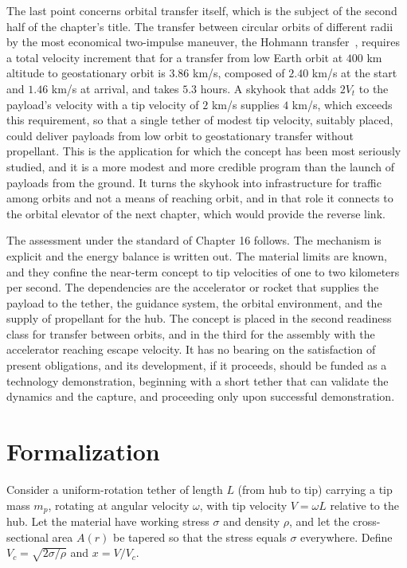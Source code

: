 The last point concerns orbital transfer itself, which is the subject of the second half of the chapter's title. The transfer between circular orbits of different radii by the most economical two-impulse maneuver, the Hohmann transfer~\cite{hohmann1925}, requires a total velocity increment that for a transfer from low Earth orbit at $400$ km altitude to geostationary orbit is $3.86$ km/s, composed of $2.40$ km/s at the start and $1.46$ km/s at arrival, and takes $5.3$ hours. A skyhook that adds $2V_t$ to the payload's velocity with a tip velocity of $2$ km/s supplies $4$ km/s, which exceeds this requirement, so that a single tether of modest tip velocity, suitably placed, could deliver payloads from low orbit to geostationary transfer without propellant. This is the application for which the concept has been most seriously studied, and it is a more modest and more credible program than the launch of payloads from the ground. It turns the skyhook into infrastructure for traffic among orbits and not a means of reaching orbit, and in that role it connects to the orbital elevator of the next chapter, which would provide the reverse link.

The assessment under the standard of Chapter 16 follows. The mechanism is explicit and the energy balance is written out. The material limits are known, and they confine the near-term concept to tip velocities of one to two kilometers per second. The dependencies are the accelerator or rocket that supplies the payload to the tether, the guidance system, the orbital environment, and the supply of propellant for the hub. The concept is placed in the second readiness class for transfer between orbits, and in the third for the assembly with the accelerator reaching escape velocity. It has no bearing on the satisfaction of present obligations, and its development, if it proceeds, should be funded as a technology demonstration, beginning with a short tether that can validate the dynamics and the capture, and proceeding only upon successful demonstration.

\section*{Formalization}

Consider a uniform-rotation tether of length $L$ (from hub to tip) carrying a tip mass $m_p$, rotating at angular velocity $\omega$, with tip velocity $V=\omega L$ relative to the hub. Let the material have working stress $\sigma$ and density $\rho$, and let the cross-sectional area $A(r)$ be tapered so that the stress equals $\sigma$ everywhere. Define $V_c=\sqrt{2\sigma/\rho}$ and $x=V/V_c$.

